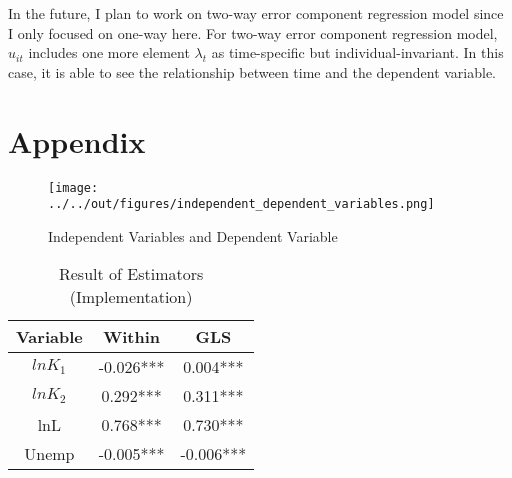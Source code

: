 \documentclass[11pt, a4paper, leqno]{article}
\begin{document}
In the future, I plan to work on two-way error component regression model since I only focused on one-way here. For two-way error component regression model, $u_{it}$ includes one more element $\lambda_t$ as time-specific but individual-invariant. In this case, it is able to see the relationship between time and the dependent variable.

\printbibliography
{}



\section{Appendix}
\label{sec:Appendix}
\begin{figure}
    \caption{Independent Variables and Dependent Variable}
    
    \texttt{[image: ../../out/figures/independent\_dependent\_variables.png]}

\end{figure}

\begin{table}[htbp]\centering
\caption{Result of Estimators (Implementation)}
\begin{tabular}{c c c}
\toprule
\textbf{Variable}  & \textbf{Within}  & \textbf{GLS}\\ 
\midrule
$lnK_1$ &   -0.026*** &        0.004***      \\
$lnK_2$ &   0.292***   &       0.311***       \\
lnL   &   0.768*** &         0.730***        \\
Unemp &   -0.005*** &        -0.006***        \\        
\end{tabular}
\end{table}


\end{document}
